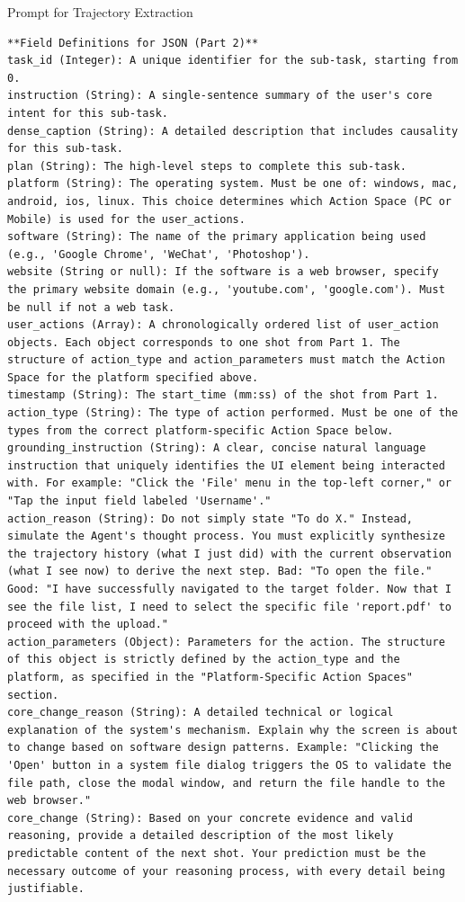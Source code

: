 \documentclass{article}
\theoremstyle{plain}
\theoremstyle{definition}
\theoremstyle{remark}
\begin{document}
\begin{promptbox}{Prompt for Trajectory Extraction}
\begin{lstlisting}
**Field Definitions for JSON (Part 2)**
task_id (Integer): A unique identifier for the sub-task, starting from 0.
instruction (String): A single-sentence summary of the user's core intent for this sub-task.
dense_caption (String): A detailed description that includes causality for this sub-task.
plan (String): The high-level steps to complete this sub-task.
platform (String): The operating system. Must be one of: windows, mac, android, ios, linux. This choice determines which Action Space (PC or Mobile) is used for the user_actions.
software (String): The name of the primary application being used (e.g., 'Google Chrome', 'WeChat', 'Photoshop').
website (String or null): If the software is a web browser, specify the primary website domain (e.g., 'youtube.com', 'google.com'). Must be null if not a web task.
user_actions (Array): A chronologically ordered list of user_action objects. Each object corresponds to one shot from Part 1. The structure of action_type and action_parameters must match the Action Space for the platform specified above.
timestamp (String): The start_time (mm:ss) of the shot from Part 1.
action_type (String): The type of action performed. Must be one of the types from the correct platform-specific Action Space below.
grounding_instruction (String): A clear, concise natural language instruction that uniquely identifies the UI element being interacted with. For example: "Click the 'File' menu in the top-left corner," or "Tap the input field labeled 'Username'."
action_reason (String): Do not simply state "To do X." Instead, simulate the Agent's thought process. You must explicitly synthesize the trajectory history (what I just did) with the current observation (what I see now) to derive the next step. Bad: "To open the file." Good: "I have successfully navigated to the target folder. Now that I see the file list, I need to select the specific file 'report.pdf' to proceed with the upload."
action_parameters (Object): Parameters for the action. The structure of this object is strictly defined by the action_type and the platform, as specified in the "Platform-Specific Action Spaces" section.
core_change_reason (String): A detailed technical or logical explanation of the system's mechanism. Explain why the screen is about to change based on software design patterns. Example: "Clicking the 'Open' button in a system file dialog triggers the OS to validate the file path, close the modal window, and return the file handle to the web browser."
core_change (String): Based on your concrete evidence and valid reasoning, provide a detailed description of the most likely predictable content of the next shot. Your prediction must be the necessary outcome of your reasoning process, with every detail being justifiable.


\end{lstlisting}
\end{promptbox}
\end{document}
